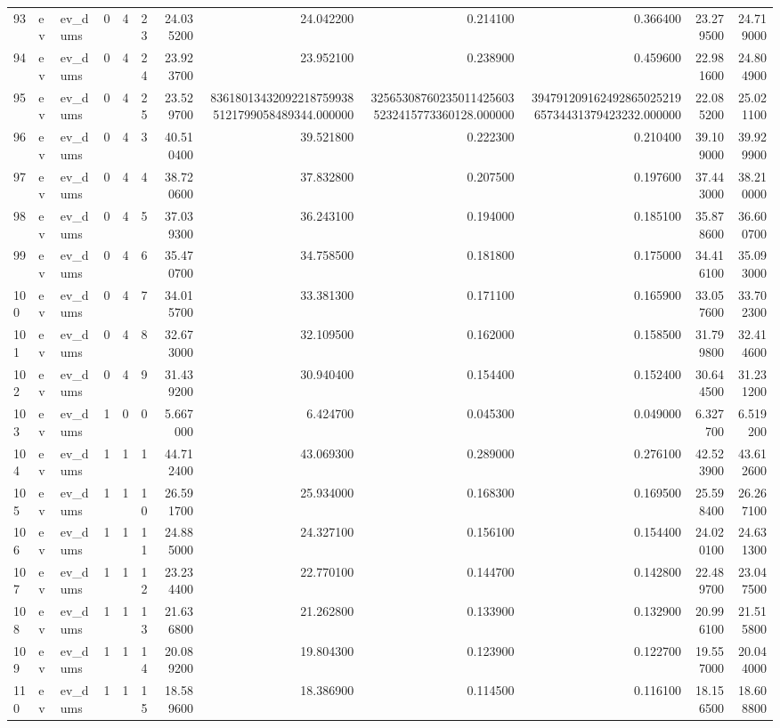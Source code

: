 \begin{tabular}{llllllrrrrrr}
93 & ev & ev_dums & 0 & 4 & 23 & 24.035200 & 24.042200 & 0.214100 & 0.366400 & 23.279500 & 24.719000 \\
94 & ev & ev_dums & 0 & 4 & 24 & 23.923700 & 23.952100 & 0.238900 & 0.459600 & 22.981600 & 24.804900 \\
95 & ev & ev_dums & 0 & 4 & 25 & 23.529700 & 836180134320922187599385121799058489344.000000 & 325653087602350114256035232415773360128.000000 & 39479120916249286502521965734431379423232.000000 & 22.085200 & 25.021100 \\
96 & ev & ev_dums & 0 & 4 & 3 & 40.510400 & 39.521800 & 0.222300 & 0.210400 & 39.109000 & 39.929900 \\
97 & ev & ev_dums & 0 & 4 & 4 & 38.720600 & 37.832800 & 0.207500 & 0.197600 & 37.443000 & 38.210000 \\
98 & ev & ev_dums & 0 & 4 & 5 & 37.039300 & 36.243100 & 0.194000 & 0.185100 & 35.878600 & 36.600700 \\
99 & ev & ev_dums & 0 & 4 & 6 & 35.470700 & 34.758500 & 0.181800 & 0.175000 & 34.416100 & 35.093000 \\
100 & ev & ev_dums & 0 & 4 & 7 & 34.015700 & 33.381300 & 0.171100 & 0.165900 & 33.057600 & 33.702300 \\
101 & ev & ev_dums & 0 & 4 & 8 & 32.673000 & 32.109500 & 0.162000 & 0.158500 & 31.799800 & 32.414600 \\
102 & ev & ev_dums & 0 & 4 & 9 & 31.439200 & 30.940400 & 0.154400 & 0.152400 & 30.644500 & 31.231200 \\
103 & ev & ev_dums & 1 & 0 & 0 & 5.667000 & 6.424700 & 0.045300 & 0.049000 & 6.327700 & 6.519200 \\
104 & ev & ev_dums & 1 & 1 & 1 & 44.712400 & 43.069300 & 0.289000 & 0.276100 & 42.523900 & 43.612600 \\
105 & ev & ev_dums & 1 & 1 & 10 & 26.591700 & 25.934000 & 0.168300 & 0.169500 & 25.598400 & 26.267100 \\
106 & ev & ev_dums & 1 & 1 & 11 & 24.885000 & 24.327100 & 0.156100 & 0.154400 & 24.020100 & 24.631300 \\
107 & ev & ev_dums & 1 & 1 & 12 & 23.234400 & 22.770100 & 0.144700 & 0.142800 & 22.489700 & 23.047500 \\
108 & ev & ev_dums & 1 & 1 & 13 & 21.636800 & 21.262800 & 0.133900 & 0.132900 & 20.996100 & 21.515800 \\
109 & ev & ev_dums & 1 & 1 & 14 & 20.089200 & 19.804300 & 0.123900 & 0.122700 & 19.557000 & 20.044000 \\
110 & ev & ev_dums & 1 & 1 & 15 & 18.589600 & 18.386900 & 0.114500 & 0.116100 & 18.156500 & 18.608800 \\

\end{tabular}
